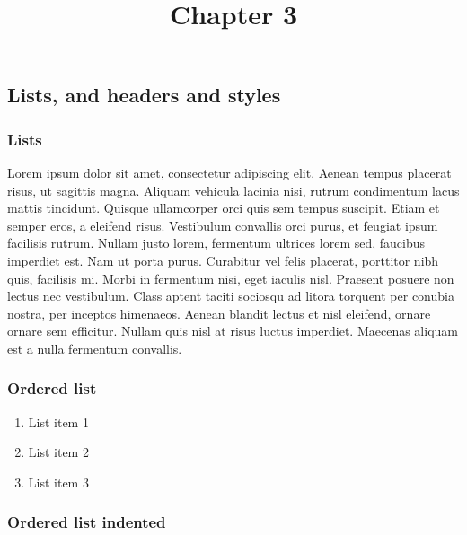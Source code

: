 \documentclass{article}
\begin{document}
\title{Chapter 3}

\maketitle


\subsection{Lists, and headers and styles}\label{H3039027}



\subsubsection{Lists}\label{H5537956}



Lorem ipsum dolor sit amet, consectetur adipiscing elit. Aenean tempus placerat risus, ut sagittis magna. Aliquam vehicula lacinia nisi, rutrum condimentum lacus mattis tincidunt. Quisque ullamcorper orci quis sem tempus suscipit. Etiam et semper eros, a eleifend risus. Vestibulum convallis orci purus, et feugiat ipsum facilisis rutrum. Nullam justo lorem, fermentum ultrices lorem sed, faucibus imperdiet est. Nam ut porta purus. Curabitur vel felis placerat, porttitor nibh quis, facilisis mi. Morbi in fermentum nisi, eget iaculis nisl. Praesent posuere non lectus nec vestibulum. Class aptent taciti sociosqu ad litora torquent per conubia nostra, per inceptos himenaeos. Aenean blandit lectus et nisl eleifend, ornare ornare sem efficitur. Nullam quis nisl at risus luctus imperdiet. Maecenas aliquam est a nulla fermentum convallis.


\subsubsection{Ordered list}\label{H4082896}


\begin{enumerate}
\item List item 1


\item List item 2


\item List item 3


\end{enumerate}

\subsubsection{Ordered list indented}\label{H4354781}
\end{document}
